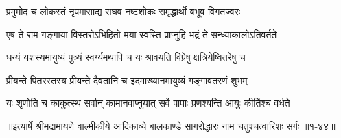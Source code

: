 \twolineshloka
{प्रमुमोद च लोकस्तं नृपमासाद्य राघव}
{नष्टशोकः समृद्धार्थो बभूव विगतज्वरः} %

\twolineshloka
{एष ते राम गङ्गाया विस्तरोऽभिहितो मया}
{स्वस्ति प्राप्नुहि भद्रं ते सन्ध्याकालोऽतिवर्तते} %

\twolineshloka
{धन्यं यशस्यमायुष्यं पुत्र्यं स्वर्ग्यमथापि च}
{यः श्रावयति विप्रेषु क्षत्रियेष्वितरेषु च} %

\twolineshloka
{प्रीयन्ते पितरस्तस्य प्रीयन्ते दैवतानि च}
{इदमाख्यानमायुष्यं गङ्गावतरणं शुभम्} %

\twolineshloka
{यः शृणोति च काकुत्स्थ सर्वान् कामानवाप्नुयात्}
{सर्वे पापाः प्रणश्यन्ति आयुः कीर्तिश्च वर्धते} %


॥इत्यार्षे श्रीमद्रामायणे वाल्मीकीये आदिकाव्ये बालकाण्डे सागरोद्धारः नाम चतुश्चत्वारिंशः सर्गः ॥१-४४॥
